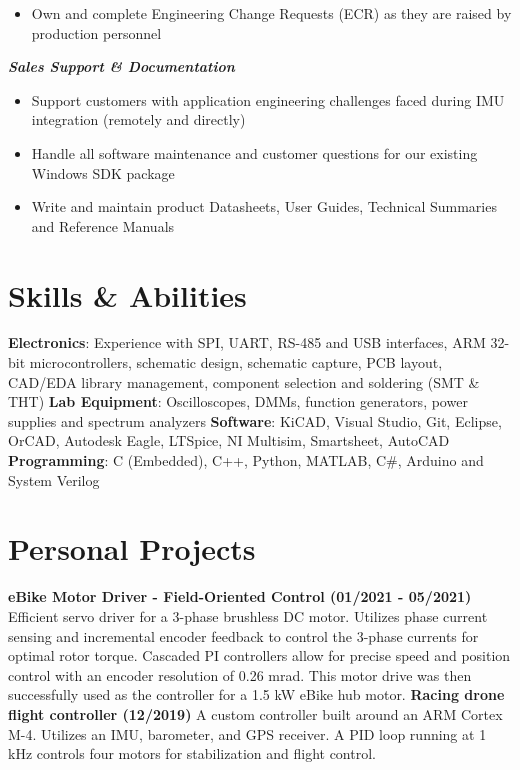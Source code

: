 \documentclass[]{article}
\begin{document}
\begin{singlespace}
\begin{itemize}
    \vspace{-1mm}
    \item Own and complete Engineering Change Requests (ECR) as they are raised by production personnel

\end{itemize}

\noindent\textbf{\emph{Sales Support \& Documentation}}
\vspace{-2mm}
\begin{itemize}
    \setlength\itemsep{0em}
    \item Support customers with application engineering challenges faced during IMU integration (remotely and directly)
    \item Handle all software maintenance and customer questions for our existing Windows SDK package 
    \item Write and maintain product Datasheets, User Guides, Technical Summaries and Reference Manuals 
\end{itemize}

\section*{Skills \& Abilities}

\textbf{Electronics}: Experience with SPI, UART, RS-485 and USB interfaces, ARM 32-bit microcontrollers, schematic design, schematic capture, PCB layout,
CAD/EDA library management, component selection and soldering (SMT \& THT)
\newline\textbf{Lab Equipment}: Oscilloscopes, DMMs, function generators, power supplies and spectrum analyzers
\newline\textbf{Software}: KiCAD, Visual Studio, Git, Eclipse, OrCAD, Autodesk Eagle, LTSpice, NI Multisim, Smartsheet, AutoCAD
\newline\textbf{Programming}: C (Embedded), C++, Python, MATLAB, C\#, Arduino and System Verilog


\section*{Personal Projects}


\textbf{eBike Motor Driver - Field-Oriented Control (01/2021 - 05/2021)}\newline
Efficient servo driver for a 3-phase brushless DC motor.
Utilizes phase current sensing and incremental encoder feedback to control the 3-phase currents for optimal rotor torque.
Cascaded PI controllers allow for precise speed and position control with an encoder resolution of 0.26 mrad.\newline
This motor drive was then successfully used as the controller for a 1.5 kW eBike hub motor.
\vspace{-2mm}\newline\newline
\textbf{Racing drone flight controller (12/2019)}\newline
A custom controller built around an ARM Cortex M-4. Utilizes an IMU, barometer, and GPS receiver. A PID loop
running at 1 kHz controls four motors for stabilization and flight control.



\end{singlespace}
\end{document}
